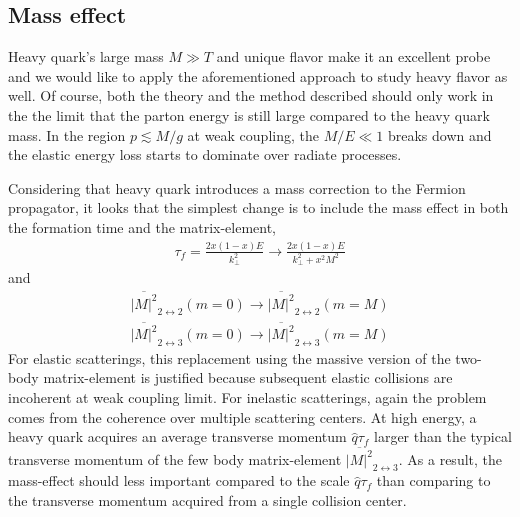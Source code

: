 \subsection{Mass effect}
Heavy quark's large mass $M\gg T$ and unique flavor make it an excellent probe and we would like to apply the aforementioned approach to study heavy flavor as well. 
Of course, both the theory and the method described should only work in the the limit that the parton energy is still large compared to the heavy quark mass.
In the region $p \lesssim M/g$ at weak coupling, the $M/E \ll 1$ breaks down and the elastic energy loss starts to dominate over radiate processes.

Considering that heavy quark introduces a mass correction to the Fermion propagator, it looks that the simplest change is to include the mass effect in both the formation time and the matrix-element,
\begin{eqnarray}
\tau_f = \frac{2x(1-x)E}{k_\perp^2} \rightarrow \frac{2x(1-x)E}{k_\perp^2 + x^2 M^2}
\end{eqnarray}
and 
\begin{eqnarray}
\overline{|M|^2}_{2\leftrightarrow 2}(m=0) \rightarrow \overline{|M|^2}_{2\leftrightarrow 2}(m=M)\\
\overline{|M|^2}_{2\leftrightarrow 3}(m=0) \rightarrow \overline{|M|^2}_{2\leftrightarrow 3}(m=M)
\end{eqnarray}
For elastic scatterings, this replacement using the massive version of the two-body matrix-element is justified because subsequent elastic collisions are incoherent at weak coupling limit.
For inelastic scatterings, again the problem comes from the coherence over multiple scattering centers.
At high energy, a heavy quark acquires an average transverse momentum $\hat{q} \tau_f$ larger than the typical transverse momentum of the few body matrix-element $\overline{|M|^2}_{2\leftrightarrow 3}$.
As a result, the mass-effect should less important compared to the scale $\hat{q} \tau_f$ than comparing to the transverse momentum acquired from a single collision center. 

